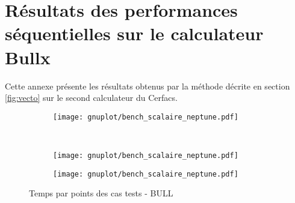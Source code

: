 \newpage
\section{Résultats des performances séquentielles sur le calculateur Bullx}\label{app:seq_neptune}

Cette annexe présente les résultats obtenus par la méthode décrite en section \ref{fig:vecto} sur le second calculateur du Cerfacs.

\begin{figure}[!ht]
  \centering
  \begin{subfigure}[b]{0.5\textwidth}
    \centering
    \texttt{[image: gnuplot/bench\_scalaire\_neptune.pdf]}
  \caption{\label{fig:bench_scal_neptune_nonper}}
  \end{subfigure}%
  ~
  \begin{subfigure}[b]{0.5\textwidth}
    \centering
    \texttt{[image: gnuplot/bench\_scalaire\_neptune.pdf]}
  \caption{\label{fig:bench_scal_neptune_sym}}
  \end{subfigure}
  \begin{subfigure}[b]{0.5\textwidth}
    \centering
    \texttt{[image: gnuplot/bench\_scalaire\_neptune.pdf]}
  \caption{\label{fig:bench_scal_neptune_per}}
  \end{subfigure}
  \caption{\label{fig:bench_scal_neptune}Temps par points des cas tests - BULL}
\end{figure}


%


